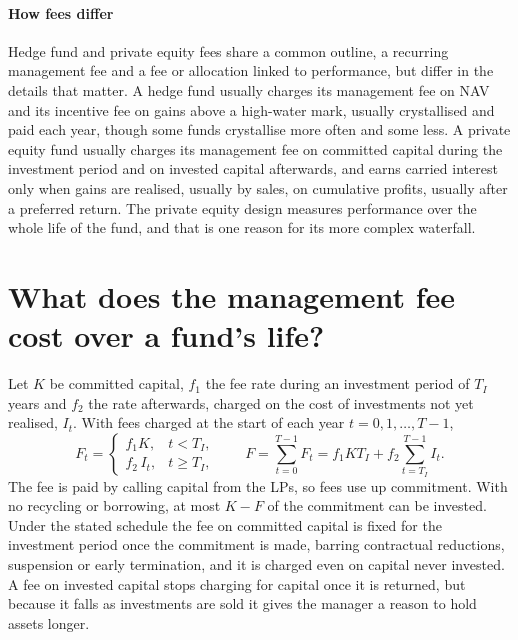 \begin{chapterrefs}
\paragraph{How fees differ}
Hedge fund and private equity fees share a common outline, a recurring management fee and a fee or allocation linked to performance,
but differ in the details that matter. A hedge fund usually charges its management fee on NAV and its
incentive fee on gains above a high-water mark, usually crystallised and paid each year, though some
funds crystallise more often and some less. A private equity
fund usually charges its management fee on committed capital during the investment period and on
invested capital afterwards, and earns carried interest only when gains are realised, usually by sales, on cumulative
profits, usually after a preferred return. The private equity design measures performance over the whole life
of the fund, and that is one reason for its more complex waterfall.

\FloatBarrier
\section{What does the management fee cost over a fund's life?}
\label{sec2:mgmtfees}

Let $K$ be committed capital, $f_1$ the fee rate during an investment period of $T_I$ years and $f_2$
the rate afterwards, charged on the cost of investments not yet realised, $I_t$. With fees charged at
the start of each year $t = 0, 1, \dots, T-1$,
\begin{equation}\label{eq2:mgmtfee}
  F_t = \begin{cases} f_1 K, & t < T_I,\\ f_2\, I_t, & t \ge T_I,\end{cases}
  \qquad
  F = \sum_{t=0}^{T-1} F_t = f_1 K T_I + f_2 \sum_{t=T_I}^{T-1} I_t .
\end{equation}
The fee is paid by calling capital from the LPs, so fees use up commitment. With no recycling or borrowing, at most $K - F$ of the commitment can be invested. Under the stated schedule the fee on committed capital is fixed for the
investment period once the commitment is made, barring contractual reductions, suspension or early
termination, and it is charged even on capital never invested. A fee on invested capital stops
charging for capital once it is returned, but because it falls as investments are sold it gives the
manager a reason to hold assets longer.


\end{chapterrefs}
